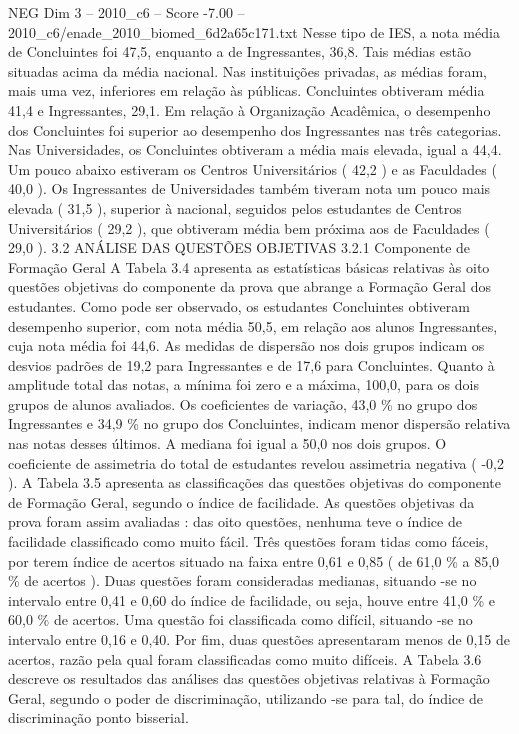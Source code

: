 \begin{textsample}{NEG Dim 3 – 2010\_c6 – Score -7.00 – 2010\_c6/enade\_2010\_biomed\_6d2a65c171.txt}
Nesse tipo de IES, a nota média de Concluintes foi 47,5, enquanto a de Ingressantes, 36,8.
Tais médias estão situadas acima da média nacional.
Nas instituições privadas, as médias foram, mais uma vez, inferiores em relação às públicas.
Concluintes obtiveram média 41,4 e Ingressantes, 29,1.
Em relação à Organização Acadêmica, o desempenho dos Concluintes foi superior ao desempenho dos Ingressantes nas três categorias.
Nas Universidades, os Concluintes obtiveram a média mais elevada, igual a 44,4.
Um pouco abaixo estiveram os Centros Universitários ( 42,2 ) e as Faculdades ( 40,0 ).
Os Ingressantes de Universidades também tiveram nota um pouco mais elevada ( 31,5 ), superior à nacional, seguidos pelos estudantes de Centros Universitários ( 29,2 ), que obtiveram média bem próxima aos de Faculdades ( 29,0 ). 3.2 ANÁLISE DAS QUESTÕES OBJETIVAS 3.2.1 Componente de Formação Geral A Tabela 3.4 apresenta as estatísticas básicas relativas às oito questões objetivas do componente da prova que abrange a Formação Geral dos estudantes.
Como pode ser observado, os estudantes Concluintes obtiveram desempenho superior, com nota média 50,5, em relação aos alunos Ingressantes, cuja nota média foi 44,6.
As medidas de dispersão nos dois grupos indicam os desvios padrões de 19,2 para Ingressantes e de 17,6 para Concluintes.
Quanto à amplitude total das notas, a mínima foi zero e a máxima, 100,0, para os dois grupos de alunos avaliados.
Os coeficientes de variação, 43,0 \% no grupo dos Ingressantes e 34,9 \% no grupo dos Concluintes, indicam menor dispersão relativa nas notas desses últimos.
A mediana foi igual a 50,0 nos dois grupos.
O coeficiente de assimetria do total de estudantes revelou assimetria negativa ( -0,2 ).
A Tabela 3.5 apresenta as classificações das questões objetivas do componente de Formação Geral, segundo o índice de facilidade.
As questões objetivas da prova foram assim avaliadas : das oito questões, nenhuma teve o índice de facilidade classificado como muito fácil.
Três questões foram tidas como fáceis, por terem índice de acertos situado na faixa entre 0,61 e 0,85 ( de 61,0 \% a 85,0 \% de acertos ).
Duas questões foram consideradas medianas, situando -se no intervalo entre 0,41 e 0,60 do índice de facilidade, ou seja, houve entre 41,0 \% e 60,0 \% de acertos.
Uma questão foi classificada como difícil, situando -se no intervalo entre 0,16 e 0,40.
Por fim, duas questões apresentaram menos de 0,15 de acertos, razão pela qual foram classificadas como muito difíceis.
A Tabela 3.6 descreve os resultados das análises das questões objetivas relativas à Formação Geral, segundo o poder de discriminação, utilizando -se para tal, do índice de discriminação ponto bisserial.

\end{textsample}
